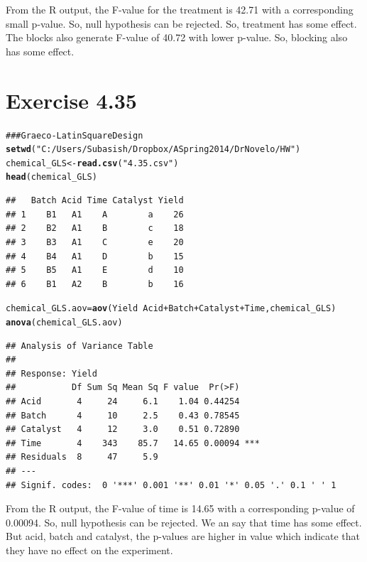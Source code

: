 \documentclass[a4paper]{article}\usepackage{graphicx, color}
\makeatletter
\newcommand{\hlfunctioncall}[1]{\textcolor[rgb]{0.501960784313725,0,0.329411764705882}{\textbf{#1}}}%
\newcommand{\hlstring}[1]{\textcolor[rgb]{0.6,0.6,1}{#1}}%
\newcommand{\hlcomment}[1]{\textcolor[rgb]{0.180392156862745,0.6,0.341176470588235}{#1}}%
\newenvironment{kframe}{%
 \def\at@end@of@kframe{}%
 \ifinner\ifhmode%
  \def\at@end@of@kframe{\end{minipage}}%
  \begin{minipage}{\columnwidth}%
 \fi\fi%
 \def\FrameCommand##1{\hskip\@totalleftmargin \hskip-\fboxsep
 \colorbox{shadecolor}{##1}\hskip-\fboxsep
     \hskip-\linewidth \hskip-\@totalleftmargin \hskip\columnwidth}%
 \MakeFramed {\advance\hsize-\width
   \@totalleftmargin\z@ \linewidth\hsize
   \@setminipage}}%
 {\par\unskip\endMakeFramed%
 \at@end@of@kframe}
\newenvironment{knitrout}{}{} %
\makeatother
\begin{document}
From the R output, the F-value for the treatment is 42.71 with a corresponding small p-value. So, null hypothesis can be rejected. So, treatment has some effect. The blocks also generate F-value of 40.72 with lower p-value. So, blocking also has some effect.


\vspace{4 mm}

\section{ Exercise 4.35}

\begin{knitrout}
\color{fgcolor}\begin{kframe}
\begin{alltt}
\hlcomment{### Graeco-Latin Square Design}
\hlfunctioncall{setwd}(\hlstring{"C:/Users/Subasish/Dropbox/A Spring 2014/Dr Novelo/HW"})
chemical_GLS <- \hlfunctioncall{read.csv}(\hlstring{"4.35.csv"})
\hlfunctioncall{head}(chemical_GLS)
\end{alltt}
\begin{verbatim}
##   Batch Acid Time Catalyst Yield
## 1    B1   A1    A        a    26
## 2    B2   A1    B        c    18
## 3    B3   A1    C        e    20
## 4    B4   A1    D        b    15
## 5    B5   A1    E        d    10
## 6    B1   A2    B        b    16
\end{verbatim}
\begin{alltt}
chemical_GLS.aov = \hlfunctioncall{aov}(Yield ~ Acid + Batch + Catalyst + Time, chemical_GLS)
\hlfunctioncall{anova}(chemical_GLS.aov)
\end{alltt}
\begin{verbatim}
## Analysis of Variance Table
## 
## Response: Yield
##           Df Sum Sq Mean Sq F value  Pr(>F)    
## Acid       4     24     6.1    1.04 0.44254    
## Batch      4     10     2.5    0.43 0.78545    
## Catalyst   4     12     3.0    0.51 0.72890    
## Time       4    343    85.7   14.65 0.00094 ***
## Residuals  8     47     5.9                    
## ---
## Signif. codes:  0 '***' 0.001 '**' 0.01 '*' 0.05 '.' 0.1 ' ' 1
\end{verbatim}
\end{kframe}
\end{knitrout}


From the R output, the F-value of time is 14.65 with a corresponding p-value of 0.00094. So, null hypothesis can be rejected. We an say that time has some effect. But acid, batch and catalyst, the p-values are higher in value which indicate that they have no effect on the experiment. 
\end{document}
